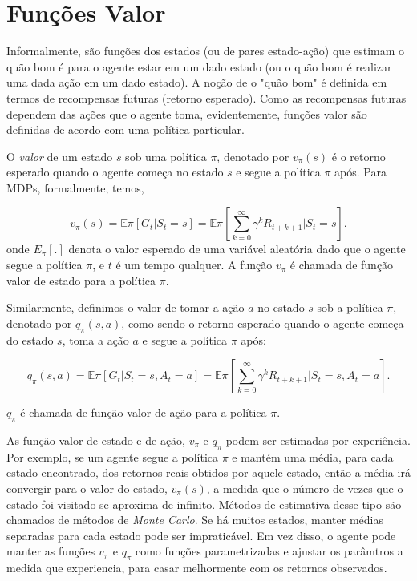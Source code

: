 \documentclass{article}
\begin{document}
\section{Funções Valor}

Informalmente,  são funções dos estados (ou de pares estado-ação) que estimam o quão bom é para o agente estar em um dado estado (ou o quão bom é realizar uma dada ação em um dado estado). A noção de o "quão bom" é definida em termos de recompensas futuras (retorno esperado). Como as recompensas futuras dependem das ações que o agente toma, evidentemente, funções valor são definidas de acordo com uma política particular. 

O \textit{valor} de um estado $s$ sob uma política $\pi$, denotado por $v_{\pi}(s)$ é o retorno esperado quando o agente começa no estado $s$ e segue a política $\pi$ após. Para MDPs, formalmente, temos,

\[
  v_{\pi}(s)=\mathbb{E}{\pi}[G_t | S_t=s]=\mathbb{E}{\pi}[\sum_{k=0}^{\infty} {\gamma}^k R_{t+k+1} | S_t = s] 
.\] 
onde $E_{\pi}[.]$ denota o valor esperado de uma variável aleatória dado que o agente segue a política $\pi$, e $t$ é um tempo qualquer. A função $v_{\pi}$ é chamada de função valor de estado para a política $\pi$.

Similarmente, definimos o valor de tomar a ação $a$ no estado $s$ sob a política $\pi$, denotado por $q_{\pi}(s,a)$, como sendo o retorno esperado quando o agente começa do estado $s$, toma a ação $a$ e segue a política $\pi$ após:

\[
  q_{\pi}(s,a)=\mathbb{E}{\pi}[G_t | S_t=s,A_t=a]=\mathbb{E}{\pi}[\sum_{k=0}^{\infty}{\gamma}^kR_{t+k+1}| S_t=s, A_t=a] 
.\] 

$q_{\pi}$ é chamada de função valor de ação para a política $\pi$.

As função valor de estado e de ação, $v_{\pi}$ e $q_{\pi}$ podem ser estimadas por experiência. Por exemplo, se um agente segue a política $\pi$ e mantém uma média, para cada estado encontrado, dos retornos reais obtidos por aquele estado, então a média irá convergir para o valor do estado, $v_{\pi}(s)$, a medida que o número de vezes que o estado foi visitado se aproxima de infinito. Métodos de estimativa desse tipo são chamados de métodos de \textit{Monte Carlo}. Se há muitos estados, manter médias separadas para cada estado pode ser impraticável. Em vez disso, o agente pode manter as funções $v_{\pi}$ e $q_{\pi}$ como funções parametrizadas e ajustar os parâmtros a medida que experiencia, para casar melhormente com os retornos observados. 
\end{document}
